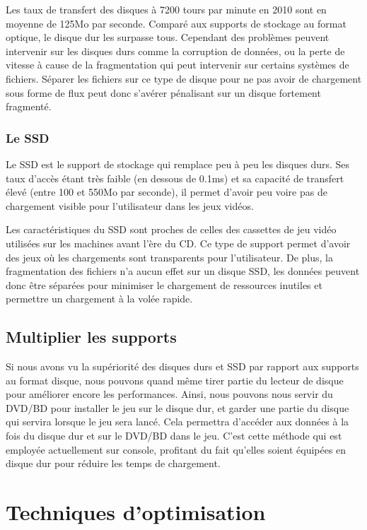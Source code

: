 \documentclass[a4paper, 11pt]{article} %
\begin{document}
Les taux de transfert des disques à 7200 tours par minute en 2010 sont en moyenne de 125Mo par seconde. Comparé aux supports de stockage au format optique, le disque dur les surpasse tous. Cependant des problèmes peuvent intervenir sur les disques durs comme la corruption de données, ou la perte de vitesse à cause de la fragmentation qui peut intervenir sur certains systèmes de fichiers. Séparer les fichiers sur ce type de disque pour ne pas avoir de chargement sous forme de flux peut donc s'avérer pénalisant sur un disque fortement fragmenté.

\newpage
\subsubsection{Le SSD}
Le SSD est le support de stockage qui remplace peu à peu les disques durs. Ses taux d'accès étant très faible (en dessous de 0.1ms) et sa capacité de transfert élevé (entre 100 et 550Mo par seconde)\cite{hardware:ssdspeed}, il permet d'avoir peu voire pas de chargement visible pour l'utilisateur dans les jeux vidéos. 

Les caractéristiques du SSD sont proches de celles des cassettes de jeu vidéo utilisées sur les machines avant l'ère du CD. Ce type de support permet d'avoir des jeux où les chargements sont transparents pour l'utilisateur. De plus, la fragmentation des fichiers n'a aucun effet sur un disque SSD, les données peuvent donc être séparées pour minimiser le chargement de ressources inutiles et permettre un chargement à la volée rapide.

\subsection{Multiplier les supports}
Si nous avons vu la supériorité des disques durs et SSD par rapport aux supports au format disque, nous pouvons quand même tirer partie du lecteur de disque pour améliorer encore les performances. Ainsi, nous pouvons nous servir du DVD/BD pour installer le jeu sur le disque dur, et garder une partie du disque qui servira lorsque le jeu sera lancé. Cela permettra d'accéder aux données à la fois du disque dur et sur le DVD/BD dans le jeu. C'est cette méthode qui est employée actuellement sur console, profitant du fait qu'elles soient équipées en disque dur pour réduire les temps de chargement.

\newpage
\section{Techniques d'optimisation}
\end{document}
